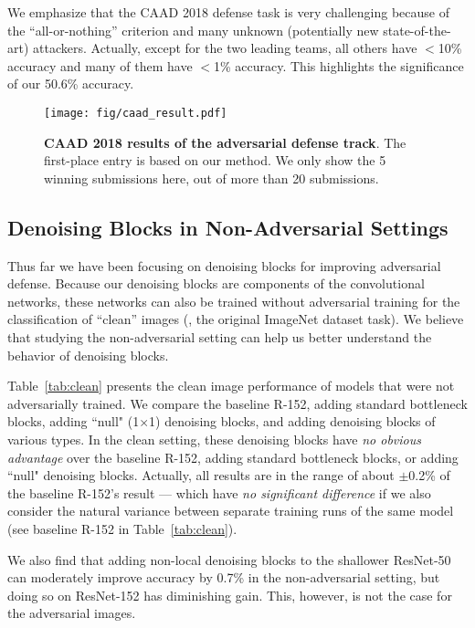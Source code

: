 \documentclass[10pt,twocolumn,letterpaper]{article}
\begin{document}
We emphasize that the CAAD 2018 defense task is very challenging because of the ``all-or-nothing'' criterion and many unknown (potentially new state-of-the-art) attackers. Actually, except for the two leading teams, all others have $<$10\% accuracy and many of them have $<$1\% accuracy. This highlights the significance of our 50.6\% accuracy.

\begin{figure}[t]
\centering
\texttt{[image: fig/caad\_result.pdf]}
\caption{\textbf{CAAD 2018 results of the adversarial defense track}.
The first-place entry is based on our method. We only show the 5 winning submissions here, out of more than 20 submissions.}
\label{fig:caad2018}
\vspace{-1.5em}
\end{figure}


\subsection{Denoising Blocks in Non-Adversarial Settings}

Thus far we have been focusing on denoising blocks for improving adversarial defense. Because our denoising blocks are components of the convolutional networks, these networks can also be trained without adversarial training for the classification of ``clean'' images (\ie, the original ImageNet dataset task). We believe that studying the non-adversarial setting can help us better understand the behavior of denoising blocks.

Table~\ref{tab:clean} presents the clean image performance of models that were not adversarially trained. We compare the baseline R-152, adding standard bottleneck blocks, adding ``null" (1$\times$1) denoising blocks, and adding denoising blocks of various types. In the clean setting, these denoising blocks have \emph{no obvious advantage} over the baseline R-152, adding standard bottleneck blocks, or adding ``null" denoising blocks. Actually, all results are in the range of about $\pm$0.2\% of the baseline R-152's result --- which have \emph{no significant difference} if we also consider the natural variance between separate training runs of the same model (see baseline R-152 in Table~\ref{tab:clean}).

We also find that adding non-local denoising blocks to the shallower ResNet-50 can moderately improve accuracy by 0.7\% in the non-adversarial setting, but doing so on ResNet-152 has diminishing gain. This, however, is not the case for the adversarial images.
\end{document}
